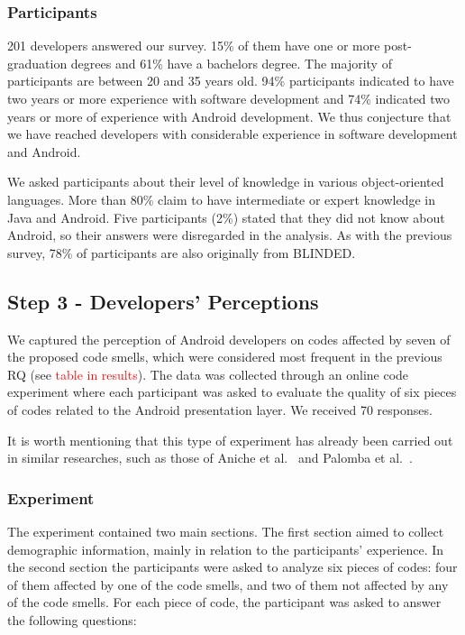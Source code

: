 \subsubsection{Participants}
\label{etapa-2-participantes}

201 developers answered our survey. 15\% of them have one or more post-graduation degrees and 61\% have a bachelors degree. The majority of participants are between 20 and 35 years old.
94\% participants indicated to have two years or more experience with software development and 74\% indicated two years or more of experience with Android development. We thus conjecture that we have reached developers with considerable experience in software development and Android.


We asked participants about their level of knowledge in various object-oriented languages. More than 80\% claim to have intermediate or expert knowledge in Java and Android. Five participants (2\%) stated that they did not know about Android, so their answers were disregarded in the analysis.
As with the previous survey, 78\% of participants are also originally from BLINDED. 


\subsection{Step 3 - Developers' Perceptions}
\label{etapa-3}


We captured the perception of Android developers on codes affected by seven of the proposed code smells, which were considered most frequent in the previous RQ (see \textcolor{red}{table in results}). The data was collected through an online code experiment where each participant was asked to evaluate the quality of six pieces of codes related to the Android presentation layer. We received 70 responses. 

It is worth mentioning that this type of experiment has already been carried out in similar researches, such as those of Aniche et al.~\cite{AnicheSmellsMVC:17, MvcSmells:16} and Palomba et al.~\cite{Palomba_Do_2014}.

\subsubsection{Experiment}
\label{etapa-3-experimento}

The experiment contained two main sections. The first section aimed to collect demographic information, mainly in relation to the participants' experience. In the second section the participants were asked to analyze six pieces of codes: four of them affected by one of the code smells, and two of them not affected by any of the code smells. For each piece of code, the participant was asked to answer the following questions:


